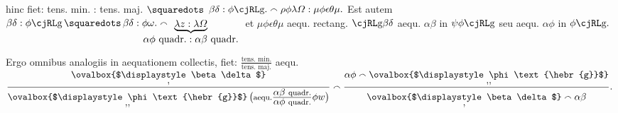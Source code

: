 hinc fiet:
tens. min. : tens. maj.
$\squaredots$ $\displaystyle \beta\delta : \phi\text{\hebr{g}}. \smallfrown \rho\phi\lambda\varOmega : \mu\phi\epsilon\theta\mu.$
\newline
\indent%
Est autem
$\displaystyle \beta\delta : \phi\text{\hebr{g}} \,\squaredots\, \beta\delta : \phi\omega. \smallfrown
\hspace*{-10,5mm}%
\efrac{}{\efrac{\displaystyle\underbrace{\displaystyle\lambda z : \lambda\varOmega}}{\displaystyle\alpha\phi\ \mbox{quadr.} : \alpha\beta\ \mbox{quadr.}}}$
\hspace*{-10,5mm}%
et $\mu\phi\epsilon\theta\mu$ aequ. rectang. $\text{\hebr{g}}\beta\delta$ aequ. $\alpha\beta$ in
$\psi\phi\text{\hebr{g}}$ seu aequ. $\alpha\phi$ in $\phi\text{\hebr{g}}.$
\rule[0pt]{0mm}{10pt}%
Ergo omnibus analogiis\protect{}
in aequationem\protect{} collectis,
fiet:%
\pend%
\vspace{0.5em}
%
\pstart%
\centering%
$\displaystyle\frac{\mbox{tens. min.}}{\mbox{tens. maj.}}$
aequ.
$\displaystyle\frac{\underset{\displaystyle{,}}{\smash[b]{\ovalbox{$\displaystyle\beta\delta$}}}}{\underset{\displaystyle{,\!,}}{\smash[b]{\ovalbox{$\displaystyle\phi\text{\hebr{g}}$}}}\,\big(\mbox{\footnotesize{aequ.}} \frac{\displaystyle\alpha\beta\ \mbox{\footnotesize{quadr.}}}{\displaystyle\alpha\phi\ \mbox{\footnotesize{quadr.}}}\phi w\big)}
\smallfrown
\frac{\alpha\phi \smallfrown \underset{\displaystyle{,\!,}}{\smash[b]{\ovalbox{$\displaystyle\phi\text{\hebr{g}}$}}}}{
\vphantom{\frac{\displaystyle\alpha\beta\ \mbox{\footnotesize{qd}}}{\displaystyle\alpha\phi\ \mbox{\footnotesize{qd}}}{\beta\delta}}
\underset{\displaystyle{,}}{\smash[b]{\ovalbox{$\displaystyle\beta\delta$}}} \smallfrown \alpha\beta}.\ $%
